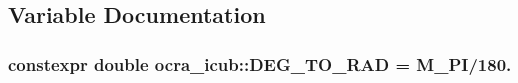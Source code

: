 \subsection{\-Variable \-Documentation}
\hypertarget{namespaceocra__icub_ab06477ded34ed5514b911a3511b22e3d}{
\subsubsection[{\-D\-E\-G\-\_\-\-T\-O\-\_\-\-R\-A\-D}]{\setlength{\rightskip}{0pt plus 5cm}constexpr double {\bf ocra\-\_\-icub\-::\-D\-E\-G\-\_\-\-T\-O\-\_\-\-R\-A\-D} = \-M\-\_\-\-P\-I/180.}}\label{namespaceocra__icub_ab06477ded34ed5514b911a3511b22e3d}
